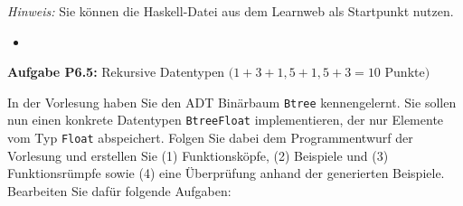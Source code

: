 \textit{Hinweis:} Sie können die Haskell-Datei aus dem Learnweb als Startpunkt nutzen.

\begin{itemize}
  \item []\inputminted{Haskell}{A6_4.hs}
\end{itemize}

\newpage

\textbf{ Aufgabe P6.5:} Rekursive Datentypen $(1+3+1,5+1,5+3=10$ Punkte$)$ 

In der Vorlesung haben Sie den ADT Binärbaum \texttt{Btree} kennengelernt. 
Sie sollen nun einen konkrete Datentypen \texttt{BtreeFloat} implementieren, 
der nur Elemente vom Typ \texttt{Float} abspeichert. Folgen Sie dabei dem 
Programmentwurf der Vorlesung und erstellen Sie (1) Funktionsköpfe, (2) Beispiele und 
(3) Funktionsrümpfe sowie (4) eine Überprüfung anhand der generierten Beispiele. 
Bearbeiten Sie dafür folgende Aufgaben:
